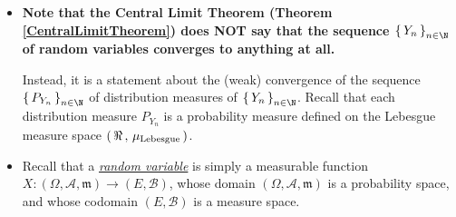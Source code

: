 \documentclass{article}
\begin{document}
\begin{remark}\mbox{} \vskip 0cm
\begin{itemize}
\item  \vskip -0.2cm
          \textbf{{\large Note that the Central Limit Theorem (Theorem \ref{CentralLimitTheorem}) does NOT say that the sequence
          $\left\{\,Y_{n}\,\right\}_{n\in\N}$ of random variables converges to anything at all.}}

          Instead, it is a statement about the (weak) convergence of the sequence $\left\{\,P_{Y_{n}}\,\right\}_{n\in\N}$
          of distribution measures of $\left\{\,Y_{n}\,\right\}_{n\in\N}$.  Recall that each distribution measure $P_{Y_{n}}$ is a probability
          measure defined on the Lebesgue measure space $\left(\,\Re\,,\,\mu_{\textnormal{Lebesgue}}\,\right)$.
\item  Recall that a \underline{\emph{random variable}} is simply a measurable function
          $X : (\Omega,\mathcal{A},\mathfrak{m}) \longrightarrow (E,\mathcal{B})$, whose domain
          $(\Omega,\mathcal{A},\mathfrak{m})$ is a probability space, and whose codomain $(E,\mathcal{B})$ is a measure space.


\end{itemize}
\end{remark}
\end{document}
